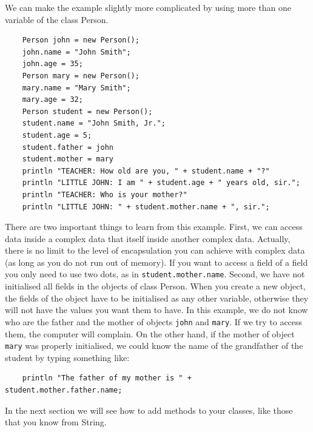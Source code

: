 We can make the example slightly more complicated by using more than
one variable of the class Person. 

\begin{verbatim}
    Person john = new Person();
    john.name = "John Smith";
    john.age = 35;
    Person mary = new Person();
    mary.name = "Mary Smith";
    mary.age = 32;
    Person student = new Person();
    student.name = "John Smith, Jr.";
    student.age = 5;
    student.father = john
    student.mother = mary
    println "TEACHER: How old are you, " + student.name + "?"
    println "LITTLE JOHN: I am " + student.age + " years old, sir.";
    println "TEACHER: Who is your mother?"
    println "LITTLE JOHN: " + student.mother.name + ", sir.";
\end{verbatim}

There are two important things to learn from this example. First, we
can access data inside a complex data that itself inside another
complex data. Actually, there is no limit to the level of
encapsulation you can achieve with complex data (as long as you do not
run out of memory). If you want to access a field of a field you only
need to use two dots, as in \verb+student.mother.name+. 
Second, we
have not initialised all fields in the objects of class Person. When
you create a new object, the fields of the object have to be
initialised as any other variable, otherwise they will not have the
values you want them to have. In this example, we do not know who are
the father and the mother of objects \verb+john+ and \verb+mary+. If
we try to access them, the computer will complain. On the other hand,
if the mother of object \verb+mary+ was properly initialised, we could
know the name of the grandfather of the student by typing something
like: 

\begin{verbatim}
    println "The father of my mother is " + student.mother.father.name;
\end{verbatim}

In the next section we will see how to add methods to your classes,
like those that you know from String. 


  
    

